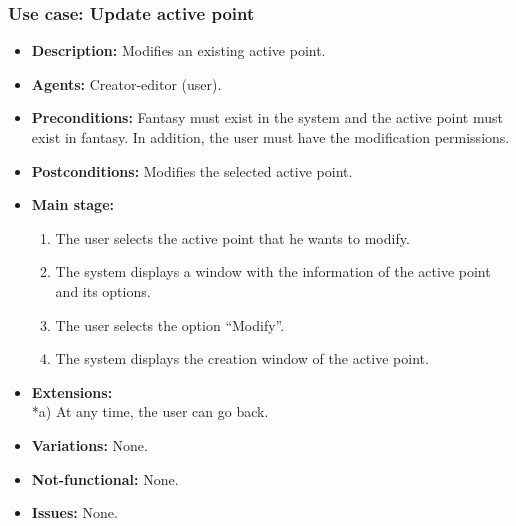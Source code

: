 \subsubsection{Use case: Update active point}
\begin{itemize}
	\item \textbf{Description:} Modifies an existing active point.
	\item \textbf{Agents:} Creator-editor (user).
	\item \textbf{Preconditions:} Fantasy must exist in the system and the active point must exist in fantasy. In addition, the user must have the modification permissions.
	\item \textbf{Postconditions:} Modifies the selected active point.
	\item \textbf{Main stage:}
	\begin{enumerate}
		\item The user selects the active point that he wants to modify.
		\item The system displays a window with the information of the active point and its options.
		\item The user selects the option ``Modify''.
		\item The system displays the creation window of the active point.
	\end{enumerate}
	\item \textbf{Extensions:} \\ *a) At any time, the user can go back.
	\item \textbf{Variations:} None.
	\item \textbf{Not-functional:} None.
	\item \textbf{Issues:} None.
\end{itemize}

